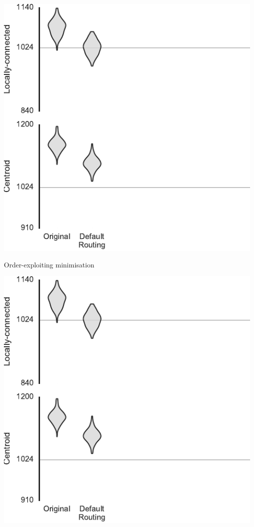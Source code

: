 \documentclass[t]{beamer}
\begin{document}
\begin{frame}[plain]{}
  \begin{center}
    \includegraphics[page=2]{experiments/presentation_plots}
  \end{center}
\end{frame}

\begin{frame}{Order-exploiting minimisation}  %
  
\end{frame}

\begin{frame}[plain]{}
  \begin{center}
    \includegraphics[page=3]{experiments/presentation_plots}
  \end{center}
\end{frame}
\end{document}
